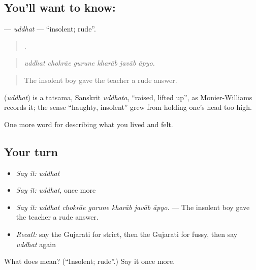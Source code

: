 \subsection*{You'll want to know: }
\textbf{} — \emph{uddhat} — \textquotedblleft{}insolent; rude\textquotedblright{}.

\begin{quote}
     .
\end{quote}

\begin{quote}
\emph{uddhat chokrāe gurune kharāb javāb āpyo.}
\end{quote}

\begin{quote}
The insolent boy gave the teacher a rude answer.
\end{quote}

\begin{cousinweb}
\textbf{} (\emph{uddhat}) is a tatsama, Sanskrit \emph{uddhata}, \textquotedblleft{}raised, lifted up\textquotedblright{}, as Monier-Williams records it; the sense \textquotedblleft{}haughty, insolent\textquotedblright{} grew from holding one's head too high.
\end{cousinweb}

\begin{grammarlens}[title={What you've built}]
One more word for describing what you lived and felt.
\end{grammarlens}

\subsection*{Your turn}
\begin{itemize}
\raggedright
  \item \emph{Say it:} \emph{uddhat}
  \item \emph{Say it:} \emph{uddhat}, once more
  \item \emph{Say it:} \emph{uddhat chokrāe gurune kharāb javāb āpyo.} — The insolent boy gave the teacher a rude answer.
  \item \emph{Recall:} say the Gujarati for strict, then the Gujarati for fussy, then say \emph{uddhat} again
\end{itemize}

\begin{tcolorbox}[breakable,colback=teal!4,colframe=teal!35!black,title={Before you move on}]
What does  mean? (\textquotedblleft{}Insolent; rude\textquotedblright{}.) Say it once more.
\end{tcolorbox}
